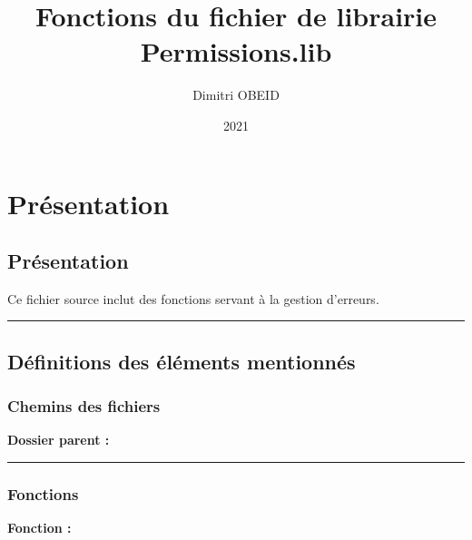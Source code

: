 \documentclass[a4paper,10pt]{article}
\title{\color{sec1}Fonctions du fichier de librairie \color{path}Permissions.lib}\color{text}
\author{Dimitri OBEID}
\date{2021}
\begin{document}
    \maketitle
    \tableofcontents
    \newpage

    \color{sec1}
    \section{Présentation}\color{text}

    \color{sec2}
    \subsection{Présentation}\color{text}
    Ce fichier source inclut des fonctions servant à la gestion d'erreurs.\\[1\baselineskip]




    \color{sec2}\par\noindent\rule{\textwidth}{0.4pt}\color{text}

    \color{sec2}
    \subsection{Définitions des éléments mentionnés}\color{text}

    \color{sec3}
    \subsubsection{Chemins des fichiers}\color{text}

    \textbf{Dossier parent :} \textbf{\color{path}\color{text}}\\[1\baselineskip]



    \color{sec3}\par\noindent\rule{\textwidth}{0.4pt}\color{text}

    \color{sec3}
    \subsubsection{Fonctions}\color{text}

    \textbf{Fonction :} \textbf{\color{func}\color{text}}\\[1\baselineskip]
\end{document}
